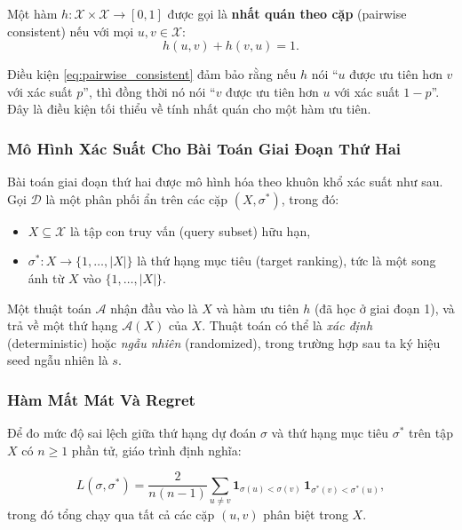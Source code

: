 \begin{definition}
Một hàm $h: \mathcal{X} \times \mathcal{X} \to [0,1]$ được gọi là \textbf{nhất quán theo cặp} (pairwise consistent) nếu với mọi $u, v \in \mathcal{X}$:
\begin{equation}
    h(u, v) + h(v, u) = 1.
    \label{eq:pairwise_consistent}
\end{equation}
\end{definition}

Điều kiện \eqref{eq:pairwise_consistent} đảm bảo rằng nếu $h$ nói ``$u$ được ưu tiên hơn $v$ với xác suất $p$'', thì đồng thời nó nói ``$v$ được ưu tiên hơn $u$ với xác suất $1-p$''. Đây là điều kiện tối thiểu về tính nhất quán cho một hàm ưu tiên.

\subsubsection{Mô Hình Xác Suất Cho Bài Toán Giai Đoạn Thứ Hai}

Bài toán giai đoạn thứ hai được mô hình hóa theo khuôn khổ xác suất như sau. Gọi $\mathcal{D}$ là một phân phối ẩn trên các cặp $(X, \sigma^*)$, trong đó:
\begin{itemize}
    \item $X \subseteq \mathcal{X}$ là tập con truy vấn (query subset) hữu hạn,
    \item $\sigma^*: X \to \{1, \ldots, |X|\}$ là thứ hạng mục tiêu (target ranking), tức là một song ánh từ $X$ vào $\{1, \ldots, |X|\}$.
\end{itemize}

Một thuật toán $\mathcal{A}$ nhận đầu vào là $X$ và hàm ưu tiên $h$ (đã học ở giai đoạn 1), và trả về một thứ hạng $\mathcal{A}(X)$ của $X$. Thuật toán có thể là \emph{xác định} (deterministic) hoặc \emph{ngẫu nhiên} (randomized), trong trường hợp sau ta ký hiệu seed ngẫu nhiên là $s$.

\subsubsection{Hàm Mất Mát Và Regret}
\label{sec:pref_loss}

Để đo mức độ sai lệch giữa thứ hạng dự đoán $\sigma$ và thứ hạng mục tiêu $\sigma^*$ trên tập $X$ có $n \geq 1$ phần tử, giáo trình định nghĩa:

\begin{definition}
\begin{equation}
    L(\sigma, \sigma^*) = \frac{2}{n(n-1)} \sum_{u \neq v} \mathbf{1}_{\sigma(u) < \sigma(v)}\, \mathbf{1}_{\sigma^*(v) < \sigma^*(u)},
    \label{eq:loss_pref}
\end{equation}
trong đó tổng chạy qua tất cả các cặp $(u, v)$ phân biệt trong $X$.
\end{definition}

